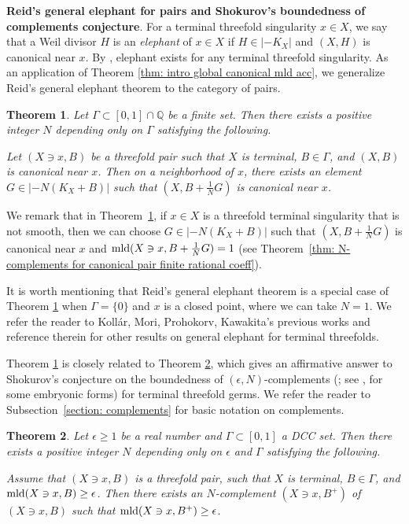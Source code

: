 \documentclass[11pt]{amsart}
\numberwithin{equation}{section}
\newcommand{\Qq}{\mathbb{Q}}
\newcommand{\mld}{{\rm{mld}}}
\newcommand{\Ii}{{\Gamma}}
\newtheorem{thm}{Theorem}[section]
\theoremstyle{definition}
\theoremstyle{definition}
\begin{document}
\noindent\textbf{Reid's general elephant for pairs and Shokurov's boundedness of complements conjecture}. For a terminal threefold singularity $x\in X$, we say that a Weil divisor $H$ is an \emph{elephant} of $x\in X$ if $H\in |-K_X|$ and $(X,H)$ is canonical near $x$. By \cite[6.4(B)]{Rei87}, elephant exists for any terminal threefold singularity. As an application of Theorem \ref{thm: intro global canonical mld acc}, we generalize Reid's general elephant theorem to the category of pairs.



\begin{thm}\label{thm: intro cc}
Let $\Ii\subset [0,1]\cap\Qq$ be a finite set. Then there exists a positive integer $N$ depending only on $\Ii$ satisfying the following.

Let $(X\ni x,B)$ be a threefold pair such that $X$ is terminal, $B\in\Ii$, and $(X,B)$ is canonical near $x$. Then on a neighborhood of $x$, there exists an element $G\in |-N(K_X+B)|$ such that $(X,B+\frac{1}{N}G)$ is canonical near $x$.
\end{thm}

We remark that in Theorem~\ref{thm: intro cc}, if $x\in X$ is a threefold terminal singularity that is not smooth, then we can choose $G\in |-N(K_X+B)|$ such that $(X,B+\frac{1}{N}G)$ is canonical near $x$ and $\mld(X\ni x, B+\frac{1}{N}G)=1$ (see Theorem~\ref{thm: N-complements for canonical pair finite rational coeff}).


It is worth mentioning that Reid's general elephant theorem is a special case of Theorem \ref{thm: intro cc} when $\Ii=\{0\}$ and $x$ is a closed point, where we can take $N=1$. We refer the reader to Koll\'ar, Mori, Prohokorv, Kawakita's previous works  \cite{KM92,Kaw02,MP08,MP09,MP21} and reference therein for other results on general elephant for terminal threefolds. 

Theorem \ref{thm: intro cc} is closely related to Theorem \ref{thm: intro ecc}, which gives an affirmative answer to Shokurov's conjecture on the boundedness of $(\epsilon,N)$-complements (\cite[Conjecture 1.1]{CH21}; see \cite[Conjecture]{Sho04b}, \cite[Conjectures 1.3, 1.4]{Bir04} for some embryonic forms) for terminal threefold germs. We refer the reader to Subsection~\ref{section: complements} for basic notation on complements.

\begin{thm}\label{thm: intro ecc}
Let $\epsilon\geq 1$ be a real number and $\Ii\subset [0,1]$ a DCC set. Then there exists a positive integer $N$ depending only on $\epsilon$ and $\Ii$ satisfying the following. 

Assume that $(X\ni x,B)$ is a threefold pair, such that $X$ is terminal, $B\in\Ii$, and $\mld(X\ni x,B)\geq\epsilon$. Then there exists an $N$-complement  $(X\ni x,B^+)$ of $(X\ni x,B)$ such that $\mld(X\ni x,B^+)\geq\epsilon$.
\end{thm}
\end{document}
